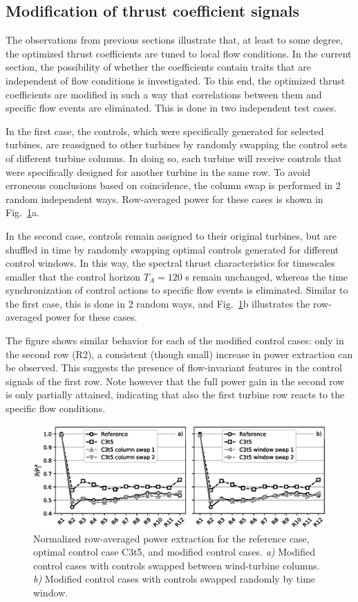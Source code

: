 \documentclass[wes, manuscript]{copernicus}
\begin{document}
\subsection{Modification of thrust coefficient signals}\label{sec:modified_thrust}
The observations from previous sections illustrate that, at least to some degree, the optimized thrust coefficients are tuned to local flow conditions. In the current section, the possibility of whether the coefficients contain traits that are independent of flow conditions is investigated. To this end, the optimized thrust coefficients are modified in such a way that correlations between them and specific flow events are eliminated. This is done in two independent test cases.

In the first case, the controls, which were specifically generated for selected turbines, are reassigned to other turbines by randomly swapping the control sets of different turbine columns. In doing so, each turbine will receive controls that were specifically designed for another turbine in the same row. To avoid erroneous conclusions based on coincidence, the column swap is performed in 2 random independent ways. Row-averaged power for these cases is shown in Fig.~\ref{fig:scrambled}a. 

In the second case, controls remain assigned to their original turbines, but are shuffled in time by randomly swapping optimal controls generated for different control windows. In this way, the spectral thrust characteristics for timescales smaller that the control horizon $T_A = 120$ s remain unchanged, whereas the time synchronization of control actions to specific flow events is eliminated. Similar to the first case, this is done in 2 random ways, and Fig.~\ref{fig:scrambled}b illustrates the row-averaged power for these cases.

The figure shows similar behavior for each of the modified control cases: only in the second row (R2), a consistent (though small) increase in power extraction can be observed. This suggests the presence of flow-invariant	features in the control signals of the first row. Note however that the full power gain in the second row is only partially attained, indicating that also the first turbine row reacts to the specific flow conditions.  

\begin{figure}
	\includegraphics[width=\textwidth]{figure11}
	\caption{Normalized row-averaged power extraction for the reference case, optimal control case C3t5, and modified control cases. \emph{a)} Modified control cases with controls swapped between wind-turbine columns. \emph{b)} Modified control cases with controls swapped randomly by time window. \label{fig:scrambled}}
\end{figure}
\end{document}

